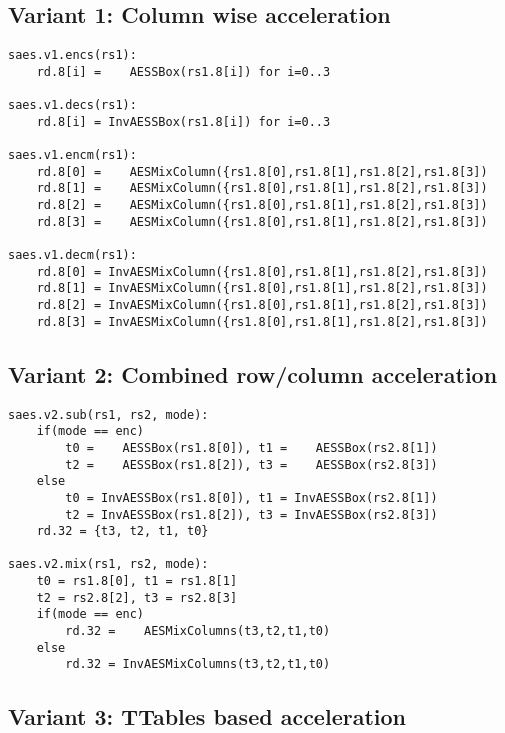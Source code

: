 
\subsection{Variant 1: Column wise acceleration}

\begin{lstlisting}[language=pseudo]
saes.v1.encs(rs1):
    rd.8[i] =    AESSBox(rs1.8[i]) for i=0..3

saes.v1.decs(rs1):
    rd.8[i] = InvAESSBox(rs1.8[i]) for i=0..3

saes.v1.encm(rs1):
    rd.8[0] =    AESMixColumn({rs1.8[0],rs1.8[1],rs1.8[2],rs1.8[3])
    rd.8[1] =    AESMixColumn({rs1.8[0],rs1.8[1],rs1.8[2],rs1.8[3])
    rd.8[2] =    AESMixColumn({rs1.8[0],rs1.8[1],rs1.8[2],rs1.8[3])
    rd.8[3] =    AESMixColumn({rs1.8[0],rs1.8[1],rs1.8[2],rs1.8[3])

saes.v1.decm(rs1):
    rd.8[0] = InvAESMixColumn({rs1.8[0],rs1.8[1],rs1.8[2],rs1.8[3])
    rd.8[1] = InvAESMixColumn({rs1.8[0],rs1.8[1],rs1.8[2],rs1.8[3])
    rd.8[2] = InvAESMixColumn({rs1.8[0],rs1.8[1],rs1.8[2],rs1.8[3])
    rd.8[3] = InvAESMixColumn({rs1.8[0],rs1.8[1],rs1.8[2],rs1.8[3])
\end{lstlisting}


\subsection{Variant 2: Combined row/column acceleration}

\cite{TG:20}

\begin{lstlisting}[language=pseudo]
saes.v2.sub(rs1, rs2, mode):
    if(mode == enc)
        t0 =    AESSBox(rs1.8[0]), t1 =    AESSBox(rs2.8[1])
        t2 =    AESSBox(rs1.8[2]), t3 =    AESSBox(rs2.8[3])
    else
        t0 = InvAESSBox(rs1.8[0]), t1 = InvAESSBox(rs2.8[1])
        t2 = InvAESSBox(rs1.8[2]), t3 = InvAESSBox(rs2.8[3])
    rd.32 = {t3, t2, t1, t0} 

saes.v2.mix(rs1, rs2, mode):
    t0 = rs1.8[0], t1 = rs1.8[1]
    t2 = rs2.8[2], t3 = rs2.8[3]
    if(mode == enc)
        rd.32 =    AESMixColumns(t3,t2,t1,t0)
    else
        rd.32 = InvAESMixColumns(t3,t2,t1,t0)
\end{lstlisting}


\subsection{Variant 3: TTables based acceleration}

\cite{MJS:20}


